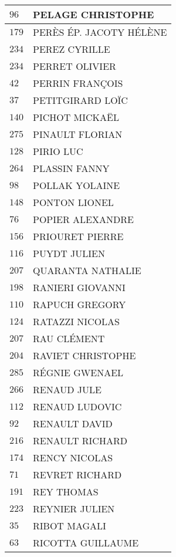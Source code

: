 \begin{xltabular}{\linewidth}{|l|X|}
    \hline
    $96$ & PELAGE CHRISTOPHE \\
    \hline
    $179$ & PERÈS ÉP. JACOTY HÉLÈNE \\
    \hline
    $234$ & PEREZ CYRILLE \\
    \hline
    $234$ & PERRET OLIVIER \\
    \hline
    $42$ & PERRIN FRANÇOIS \\
    \hline
    $37$ & PETITGIRARD LOÏC \\
    \hline
    $140$ & PICHOT MICKAËL \\
    \hline
    $275$ & PINAULT FLORIAN \\
    \hline
    $128$ & PIRIO LUC \\
    \hline
    $264$ & PLASSIN FANNY \\
    \hline
    $98$ & POLLAK YOLAINE \\
    \hline
    $148$ & PONTON LIONEL \\
    \hline
    $76$ & POPIER ALEXANDRE \\
    \hline
    $156$ & PRIOURET PIERRE \\
    \hline
    $116$ & PUYDT JULIEN \\
    \hline
    $207$ & QUARANTA NATHALIE \\
    \hline
    $198$ & RANIERI GIOVANNI \\
    \hline
    $110$ & RAPUCH GREGORY \\
    \hline
    $124$ & RATAZZI NICOLAS \\
    \hline
    $207$ & RAU CLÉMENT \\
    \hline
    $204$ & RAVIET CHRISTOPHE \\
    \hline
    $285$ & RÉGNIE GWENAEL \\
    \hline
    $266$ & RENAUD JULE \\
    \hline
    $112$ & RENAUD LUDOVIC \\
    \hline
    $92$ & RENAULT DAVID \\
    \hline
    $216$ & RENAULT RICHARD \\
    \hline
    $174$ & RENCY NICOLAS \\
    \hline
    $71$ & REVRET RICHARD \\
    \hline
    $191$ & REY THOMAS \\
    \hline
    $223$ & REYNIER JULIEN \\
    \hline
    $35$ & RIBOT MAGALI \\
    \hline
    $63$ & RICOTTA GUILLAUME \\
    \hline

\end{xltabular}
